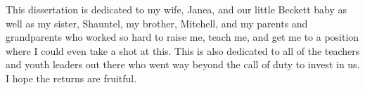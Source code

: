 This dissertation is dedicated to my wife, Janea, and our little Beckett baby as well as my sister, Shauntel, my brother, Mitchell, and my parents and grandparents who worked so hard to raise me, teach me, and get me to a position where I could even take a shot at this. This is also dedicated to all of the teachers and youth leaders out there who went way beyond the call of duty to invest in us. I hope the returns are fruitful.